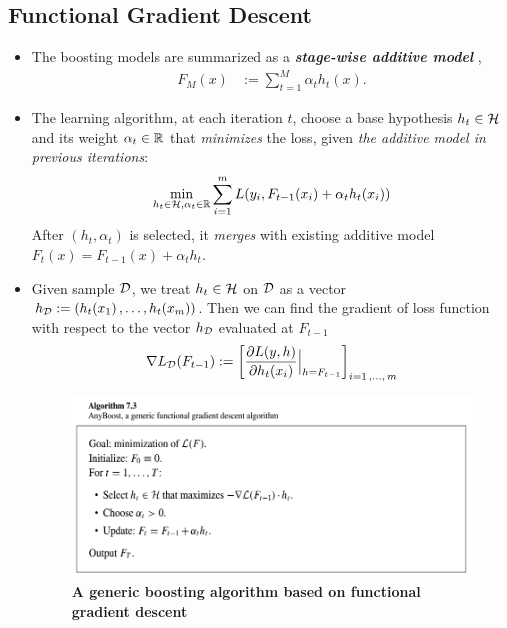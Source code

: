 \documentclass[11pt]{article}
\begin{document}
\subsection{Functional Gradient Descent}
\begin{itemize}
\item The boosting models are summarized as a \emph{\textbf{stage-wise additive model}} \citep{hastie2009elements}, 
\begin{align*}
F_{M}(x) &:= \sum_{t=1}^{M}\alpha_t h_t(x).
\end{align*}

\item The learning algorithm, at each iteration $t$, choose a base hypothesis $h_t \in {\mathcal H}$ and its weight $\alpha_t \in {\mathbb R}$ that \emph{minimizes} the loss, given \emph{the additive model in previous iterations}:
\begin{align*}
\min_{h_t \in {\mathcal H}, \alpha_t \in {\mathbb R}}\sum_{i=1}^{m}L(y_i, F_{t-1}(x_i) + \alpha_t h_t(x_i))
\end{align*} After $(h_t, \alpha_t)$ is selected, it \emph{merges} with existing additive model $F_{t}(x)  = F_{t-1}(x) + \alpha_t h_{t}$.

\item Given sample ${\mathcal D}$, we treat $h_t \in {\mathcal H}$ on ${\mathcal D}$ as a vector $h_{{\mathcal D}} := (h_t(x_1) \,{,}\ldots{,}\, h_t(x_m))$. Then we can find the gradient of loss function with respect to the vector $h_{{\mathcal D}}$ evaluated at $F_{t-1}$
\begin{align}
\nabla L_{{\mathcal D}}(F_{t-1}) := \left[\frac{\partial L(y, h)}{ \partial h_t(x_i)}\Bigr|_{h = F_{t-1}}\right]_{i=1\,{,}\ldots{,}\,m} \label{eqn: functional_gradient_on_samples}
\end{align} 

\begin{figure}
\begin{minipage}[h!]{1\linewidth}
  \centering
  \centerline{\includegraphics[scale = 0.4]{anyboost.png}}
\end{minipage}
\caption{\footnotesize{\textbf{A generic boosting algorithm based on functional gradient descent \citep{hastie2009elements}}}}
\label{fig: grad_boost}
\end{figure}


\end{itemize}
\end{document}
